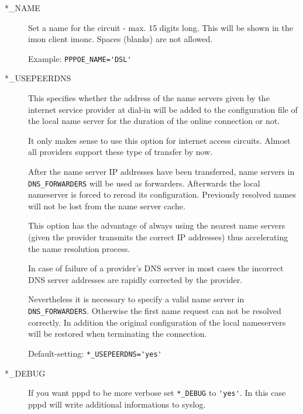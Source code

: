 \begin{description}
\item[*\_NAME]
 
Set a name for the circuit - max. 15 digits long. This will be 
shown in the imon client imonc. Spaces (blanks) are not allowed. 
 
Example: \verb*?PPPOE_NAME='DSL'?

\item[*\_USEPEERDNS]
 
This specifies whether the address of the name servers given by 
the internet service provider at dial-in will be added to the
configuration file of the local name server for the duration of 
the online connection or not.

It only makes sense to use this option for internet access circuits. 
Almost all providers support these type of transfer by now.

After the name server IP addresses have been transferred, name 
servers in \verb*?DNS_FORWARDERS? will be used as 
forwarders. Afterwards the local nameserver is forced to 
reread its configuration. Previously resolved names will 
not be lost from the name server cache.

This option has the advantage of always using the nearest name 
servers (given the provider transmits the correct IP addresses) 
thus accelerating the name resolution process.

In case of failure of a provider's DNS server in most cases the 
incorrect DNS server addresses are rapidly corrected by the provider.

Nevertheless it is necessary to specify a valid name server in 
\verb*?DNS_FORWARDERS?. Otherwise the first name request can not 
be resolved correctly. In addition the original configuration of 
the local nameservers will be restored when terminating the connection.

Default-setting: \verb*?*_USEPEERDNS='yes'?

\item[*\_DEBUG]
 
If you want pppd to be more verbose set \verb*?*_DEBUG? to
\verb*?'yes'?. In this case pppd will write additional informations
to syslog.


\end{description}
